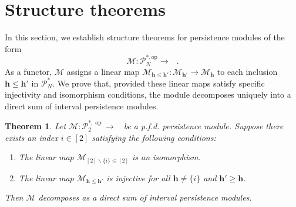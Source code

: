 \documentclass[reqno,12pt]{amsart}
\newcommand{\cM}{\mathcal{M}}
\newcommand{\cP}{\mathcal{P}}
\DeclareMathOperator{\vect}{\mathbf{vect}_\Bbbk}
\DeclareMathOperator{\op}{op}
\newcommand{\0}{\mathbf 0}
\newcommand{\h}{\mathbf{h}}
\newtheorem{theorem}{Theorem}[section]
\theoremstyle{definition}
\begin{document}
\section{Structure theorems}\label{Sec:StructureTheorems}

In this section, we establish structure theorems for persistence modules of the form $$\cM\colon\mathcal{P}^{*,\text{op}}_N\longrightarrow \vect\,.$$
As a functor, $\cM$ assigns a linear map $\cM_{\h \leq \h'}\colon \cM_{\h'} \longrightarrow \cM_{\h}$ to each inclusion $\h \leq \h'$ in $\mathcal{P}^{*}_N$. We prove that, provided these linear maps satisfy specific injectivity and isomorphism conditions, the module decomposes uniquely into a direct sum of interval persistence modules.


\begin{theorem}\label{Thm:Decomposition2}
    Let $\cM\colon \cP^{*,\op}_{2}\longrightarrow \vect$ be a p.f.d. persistence module. Suppose there exists an index $i\in [2]$ satisfying the following conditions:
    \begin{enumerate}
        \item The linear map $\cM_{[2]\smallsetminus \{i\}\leq [2]}$ is an isomorphism.
        \item \label{cond:injectivity} The linear map $\cM_{\h\leq\h'}$ is injective for all $\h\neq \{i\}$ and $\h' \geq \h$.
    \end{enumerate}
    Then $\cM$ decomposes as a direct sum of interval persistence modules.
\end{theorem}
\end{document}
